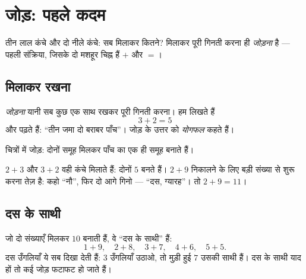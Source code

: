 \chapter{जोड़: पहले कदम}\label{ch:g1:addition}

तीन लाल कंचे और दो नीले कंचे: सब मिलाकर कितने? मिलाकर पूरी गिनती
करना ही \emph{जोड़ना} है --- पहली संक्रिया, जिसके दो मशहूर चिह्न
हैं $+$ और $=$।

\section{मिलाकर रखना}

\begin{definition}[जोड़]\label{def:g1:addition:def}
\emph{जोड़ना} यानी सब कुछ एक साथ रखकर पूरी गिनती करना। हम
लिखते हैं
\[
3 + 2 = 5
\]
और पढ़ते हैं: ``तीन जमा दो बराबर पाँच''। जोड़ के उत्तर को
\emph{योगफल} कहते हैं।
\end{definition}

\begin{omfigure}

{\small चित्रों में जोड़: दोनों समूह मिलकर पाँच का एक ही समूह
बनाते हैं।}
\end{omfigure}

\begin{example}[क्रम से फ़र्क़ नहीं पड़ता]\label{ex:g1:addition:order}
$2 + 3$ और $3 + 2$ वही कंचे मिलाते हैं: दोनों $5$ बनते हैं।
$2 + 9$ निकालने के लिए बड़ी संख्या से शुरू करना तेज़ है: कहो
``नौ'', फिर दो आगे गिनो --- ``दस, ग्यारह''। तो
$2 + 9 = 11$।
\end{example}

\section{दस के साथी}

\begin{example}[10 के पूरक]\label{ex:g1:addition:friends}
जो दो संख्याएँ मिलकर $10$ बनाती हैं, वे ``दस के साथी'' हैं:
\[
1 + 9, \quad 2 + 8, \quad 3 + 7, \quad 4 + 6, \quad 5 + 5 .
\]
दस उँगलियाँ ये सब दिखा देती हैं: $3$ उँगलियाँ उठाओ, तो मुड़ी हुई
$7$ उसकी साथी हैं। दस के साथी याद हों तो कई जोड़ फटाफट हो
जाते हैं।
\end{example}

